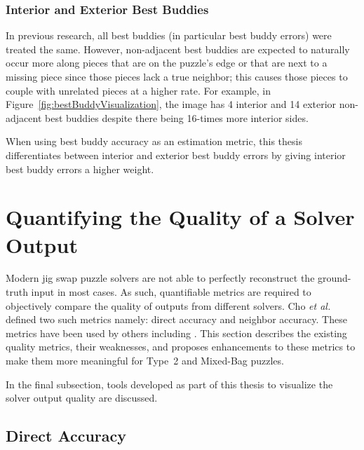 \documentclass{report}
\begin{document}
\subsubsection{Interior and Exterior Best Buddies}\label{sec:interiorExteriorBestBuddies}

In previous research, all best buddies (in particular best buddy errors) were treated the same.  However, non-adjacent best buddies are expected to naturally occur more along pieces that are on the puzzle's edge or that are next to a missing piece since those pieces lack a true neighbor; this causes those pieces to couple with unrelated pieces at a higher rate.  For example, in Figure~\ref{fig:bestBuddyVisualization}, the image has 4 interior and 14 exterior non-adjacent best buddies despite there being 16-times more interior sides. 

When using best buddy accuracy as an estimation metric, this thesis differentiates between interior and exterior best buddy errors by giving interior best buddy errors a higher weight.







\pagebreak
\section{Quantifying the Quality of a Solver Output}\label{sec:quantifyingSolverQuantify}

Modern jig swap puzzle solvers are not able to perfectly reconstruct the ground-truth input in most cases.  As such, quantifiable metrics are required to objectively compare the quality of outputs from different solvers.  Cho \textit{et al.} \cite{cho2010} defined two such metrics namely: direct accuracy and neighbor accuracy. These metrics have been used by others including \cite{sholomon2013, pomeranz2011, paikin2015, son2014, gallagher2012}.  This section describes the existing quality metrics, their weaknesses, and proposes enhancements to these metrics to make them more meaningful for Type~2 and Mixed-Bag puzzles.

In the final subsection, tools developed as part of this thesis to visualize the solver output quality are discussed.

\subsection{Direct Accuracy}\label{sec:directAccuracy}
\end{document}
